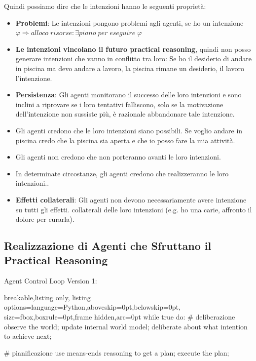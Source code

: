 Quindi possiamo dire che le intenzioni hanno le seguenti proprietà:
\begin{itemize}
    \item \textbf{Problemi}: Le intenzioni pongono problemi agli agenti, se ho un intenzione \begin{math} \varphi \Rightarrow alloco\;risorse : \exists piano \; per\;eseguire\;\varphi \end{math}
    \item \textbf{Le intenzioni vincolano il futuro practical reasoning}, quindi non posso generare intenzioni che vanno in conflitto tra loro: Se ho il desiderio di andare in piscina ma devo andare a lavoro, la piscina rimane un desiderio, il lavoro l'intenzione.
    \item \textbf{Persistenza}: Gli agenti monitorano il successo delle loro intenzioni e sono inclini a riprovare se i loro tentativi falliscono, solo se la motivazione dell’intenzione non sussiste più, è razionale abbandonare tale intenzione.
    \item Gli agenti credono che le loro intenzioni siano possibili. Se voglio andare in piscina credo che la piscina sia aperta e che io posso fare la mia attività.
    \item Gli agenti non credono che non porteranno avanti le loro intenzioni.
    \item In determinate circostanze, gli agenti credono che realizzeranno le loro intenzioni..
    \item \textbf{Effetti collaterali}: Gli agenti non devono necessariamente avere intenzione su tutti gli effetti.
collaterali delle loro intenzioni (e.g. ho una carie, affronto il dolore per curarla).
\end{itemize}

\subsection{Realizzazione di Agenti che Sfruttano il Practical Reasoning}
Agent Control Loop Version 1:
\begin{tcblisting}{breakable,listing only,
  listing options={language=Python,aboveskip=0pt,belowskip=0pt},
  size=fbox,boxrule=0pt,frame hidden,arc=0pt}
while true do:
    # deliberazione
    observe the world;
    update internal world model;
    deliberate about what intention to achieve next;
    
    # pianificazione
    use means-ends reasoning to get a plan;
    execute the plan;
\end{tcblisting}

